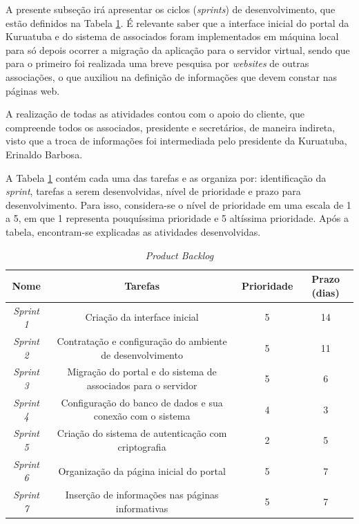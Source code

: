A presente subseção irá apresentar os ciclos (\textit{sprints}) de desenvolvimento, que estão definidos na Tabela \ref{lista-sprints}. É relevante saber que a interface inicial do portal da Kuruatuba e do sistema de associados foram implementados em máquina local para só depois ocorrer a migração da aplicação para o servidor virtual, sendo que para o primeiro foi realizada uma breve pesquisa por \textit{websites} de outras associações, o que auxiliou na definição de informações que devem constar nas páginas web. 

A realização de todas as atividades contou com o apoio do cliente, que compreende todos os associados, presidente e secretários, de maneira indireta, visto que a troca de informações foi intermediada pelo presidente da Kuruatuba, Erinaldo Barbosa.

A Tabela \ref{lista-sprints} contém cada uma das tarefas e as organiza por: identificação da \textit{sprint}, tarefas a serem desenvolvidas, nível de prioridade e prazo para desenvolvimento. Para isso, considera-se o nível de prioridade em uma escala de 1 a 5, em que 1 representa pouquíssima prioridade e 5 altíssima prioridade. Após a tabela, encontram-se explicadas as atividades desenvolvidas.

\begin{table}[h]
\centering
{}
\caption{\textit{Product Backlog}}
\vspace{0.5cm}

\setlength{\extrarowheight}{0.15cm}
\begin{tabular}{c|c|c|c}
 
\textbf{Nome} & \textbf{Tarefas} & \textbf{Prioridade} & \textbf{Prazo (dias)} \\ %
\hline                               %
\textit{Sprint 1} & Criação da interface inicial & 5 & 14  \\
\textit{Sprint 2} & Contratação e configuração do ambiente de desenvolvimento & 5 & 11  \\ %
\textit{Sprint 3} & Migração do portal e do sistema de associados para o servidor & 5 & 6  \\
\textit{Sprint 4} & Configuração do banco de dados e sua conexão com o sistema & 4 & 3  \\
\textit{Sprint 5} & Criação do sistema de autenticação com criptografia & 2 & 5  \\
\textit{Sprint 6} & Organização da página inicial do portal & 5 & 7  \\
\textit{Sprint 7} & Inserção de informações nas páginas informativas & 5 & 7  \\ %
\hline
\end{tabular}
\label{lista-sprints}
\end{table}

